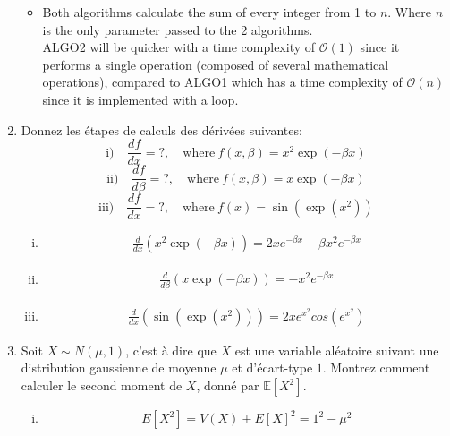 \begin{enumerate}
\begin{itemize}
    \item Both algorithms calculate the sum of every integer from 1 to $n$. Where $n$ is the only parameter passed to the 2 algorithms. \\ ALGO2 will be quicker with a time complexity of $\mathcal{O}({1})$ since it performs a single operation (composed of several mathematical operations), compared to ALGO1 which has a time complexity of $\mathcal{O}({n})$ since it is implemented with a loop.
\end{itemize}

\item {}
%
{Donnez les étapes de calculs des dérivées suivantes:}
$$
  \textrm{i)} \quad \frac{df}{dx}=?, \quad \textrm{where}\  f(x,\beta) = x^2 \exp{(-\beta x)} 
$$
$$
  \textrm{ii)} \quad \frac{df}{d\beta}=?, \quad \textrm{where}\  f(x,\beta) = x \exp{(-\beta x)} 
$$
$$
  \textrm{iii)} \quad \frac{df}{dx}=?, \quad \textrm{where}\  f(x) = \sin{(\exp{(x^2)})} 
$$

\begin{enumerate}[i)]
    \item \begin{align*}
        \frac{d}{dx}(x^2 \exp{(-\beta x)}) = 2xe^{-\beta x} - \beta x^2e^{-\beta x} 
        \end{align*}
    \item \begin{align*}
        \frac{d}{d\beta}(x \exp{(-\beta x)}) = -x^2e^{-\beta x}
        \end{align*}
    \item \begin{align*}
        \frac{d}{dx}(\sin{(\exp{(x^2)})}) = 2xe^{x^2}cos(e^{x^2})
        \end{align*}
\end{enumerate}


\item {}
%
{Soit $X\sim N(\mu,1)$, c'est à dire que $X$ est une variable aléatoire suivant une distribution gaussienne de moyenne $\mu$ et d'écart-type $1$. Montrez comment calculer le second moment de $X$, donné par $\mathbb{E}[X^2]$.}

\begin{enumerate}[i)]
    \item $$E[X^2] = V(X) + E[X]^2 = 1^2 - \mu^2$$
\end{enumerate}


\end{enumerate}